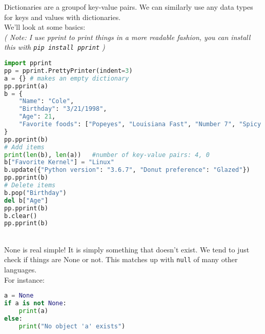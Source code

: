 \documentclass[12pt]{article}
\begin{document}
Dictionaries are a groupof key-value pairs. We can similarly use any data types for keys and values with dictionaries.\\
We'll look at some basics:\\
\textit{( Note: I use pprint to print things in a more readable fashion, you can install this with \texttt{pip install pprint} )}\\
\begin{lstlisting}[language=Python]
import pprint
pp = pprint.PrettyPrinter(indent=3)
a = {} # makes an empty dictionary
pp.pprint(a)
b = {
    "Name": "Cole",
    "Birthday": "3/21/1998",
    "Age": 21,
    "Favorite foods": ["Popeyes", "Louisiana Fast", "Number 7", "Spicy Chicken"]
}
pp.pprint(b)
# Add items
print(len(b), len(a))   #number of key-value pairs: 4, 0
b["Favorite Kernel"] = "Linux"
b.update({"Python version": "3.6.7", "Donut preference": "Glazed"})
pp.pprint(b)
# Delete items
b.pop("Birthday")
del b["Age"]
pp.pprint(b)
b.clear()
pp.pprint(b)
\end{lstlisting}

\\

None is real simple! It is simply something that doesn't exist. We tend to just check if things are None or not. This matches up with \texttt{null} of many other languages.\\
For instance:\\
\begin{lstlisting}[language=Python]
a = None
if a is not None:
    print(a)
else:
    print("No object 'a' exists")
\end{lstlisting}

\\
\end{document}
